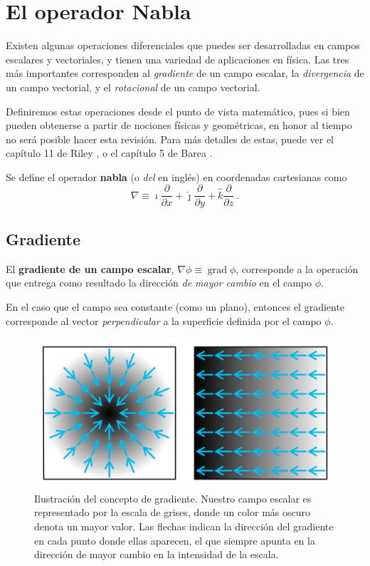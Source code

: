 \section{El operador Nabla}

Existen algunas operaciones diferenciales que puedes ser desarrolladas en campos escalares y vectoriales, y tienen una variedad de aplicaciones en física. Las tres más importantes corresponden al \emph{gradiente} de un campo escalar, la \emph{divergencia} de un campo vectorial, y el \emph{rotacional} de un campo vectorial.

Definiremos estas operaciones desde el punto de vista matemático, pues si bien pueden obtenerse a partir de nociones físicas y geométricas, en honor al tiempo no será posible hacer esta revisión. Para más detalles de estas, puede ver el capítulo 11 de Riley \cite{Riley}, o el capítulo 5 de Barea \cite{Barea}.

\begin{defi}
    Se define el operador \textbf{nabla} (o \emph{del} en inglés) en coordenadas cartesianas como 
    \begin{equation}
        \nabla \equiv \hat{\imath} \frac{\partial}{\partial x} + \hat{\jmath} \frac{\partial}{\partial y} + \hat{k} \frac{\partial}{\partial z} \ .
    \end{equation}
\end{defi}

\subsection{Gradiente}

\begin{defi}
    El \textbf{gradiente de un campo escalar}, $\nabla \phi \equiv \operatorname{grad}\phi$, corresponde a la operación que entrega como resultado la dirección \emph{de mayor cambio} en el campo $\phi$.

    En el caso que el campo sea constante (como un plano), entonces el gradiente corresponde al vector \emph{perpendicular} a la superficie definida por el campo $\phi$. 
\end{defi}

\begin{figure}[htbp]
    \centering
    \includegraphics[width=12cm]{Figuras/Gradiente.png}
    \caption{Ilustración del concepto de gradiente. Nuestro campo escalar es representado por la escala de grises, donde un color más oscuro denota un mayor valor. Las flechas indican la dirección del gradiente en cada punto donde ellas aparecen, el que siempre apunta en la dirección de mayor cambio en la intensidad de la escala.}
\end{figure}

